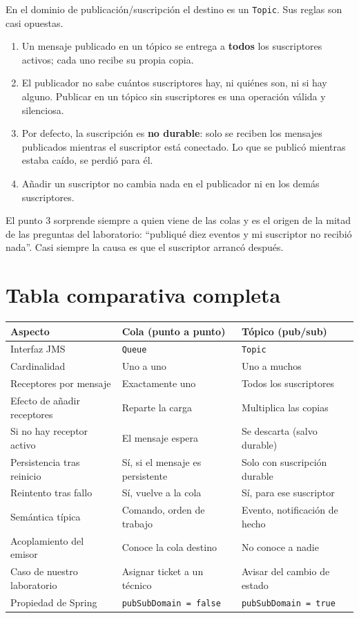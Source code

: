 \documentclass[11pt,a4paper]{book}
\newcommand{\clase}[1]{\texttt{#1}}
\begin{document}
En el dominio de publicación/suscripción el destino es un \clase{Topic}.
Sus reglas son casi opuestas.

\begin{enumerate}[leftmargin=1.8em,itemsep=3pt,topsep=3pt]
	\item Un mensaje publicado en un tópico se entrega a \textbf{todos} los suscriptores activos; cada uno recibe su propia copia.
	\item El publicador no sabe cuántos suscriptores hay, ni quiénes son, ni si hay alguno. Publicar en un tópico sin suscriptores es una operación válida y silenciosa.
	\item Por defecto, la suscripción es \textbf{no durable}: solo se reciben los mensajes publicados mientras el suscriptor está conectado. Lo que se publicó mientras estaba caído, se perdió para él.
	\item Añadir un suscriptor no cambia nada en el publicador ni en los demás suscriptores.
\end{enumerate}

El punto 3 sorprende siempre a quien viene de las colas y es el origen de la mitad de las preguntas del laboratorio: ``publiqué diez eventos y mi suscriptor no recibió nada''.
Casi siempre la causa es que el suscriptor arrancó después.

\section{Tabla comparativa completa}

\begin{center}
	\small
	\begin{tabularx}{\textwidth}{@{}p{4.0cm}XX@{}}
		\toprule
		\textbf{Aspecto} & \textbf{Cola (punto a punto)} & \textbf{Tópico (pub/sub)} \\
		\midrule
		Interfaz JMS & \clase{Queue} & \clase{Topic} \\
		Cardinalidad & Uno a uno & Uno a muchos \\
		Receptores por mensaje & Exactamente uno & Todos los suscriptores \\
		Efecto de añadir receptores & Reparte la carga & Multiplica las copias \\
		Si no hay receptor activo & El mensaje espera & Se descarta (salvo durable) \\
		Persistencia tras reinicio & Sí, si el mensaje es persistente & Solo con suscripción durable \\
		Reintento tras fallo & Sí, vuelve a la cola & Sí, para ese suscriptor \\
		Semántica típica & Comando, orden de trabajo & Evento, notificación de hecho \\
		Acoplamiento del emisor & Conoce la cola destino & No conoce a nadie \\
		Caso de nuestro laboratorio & Asignar ticket a un técnico & Avisar del cambio de estado \\
		Propiedad de Spring & \texttt{pubSubDomain = false} & \texttt{pubSubDomain = true} \\
		\bottomrule
	\end{tabularx}
\end{center}
\end{document}
